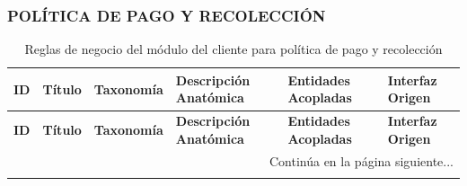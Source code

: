 \begin{landscape}
\subsubsection{POLÍTICA DE PAGO Y RECOLECCIÓN}
\begingroup
\setlength{\LTleft}{\fill}
\setlength{\LTright}{\fill}

\begin{longtable}[c]{l p{2.1cm} p{2.1cm} p{8cm} p{4cm} p{3cm}}
\caption{Reglas de negocio del módulo del cliente para política de pago y recolección} \label{tab:reglas-negocio-cliente-politica-pago-recoleccion}\\
\toprule
\textbf{ID} & \textbf{Título} & \textbf{Taxonomía} & \textbf{Descripción Anatómica} & \textbf{Entidades Acopladas} & \textbf{Interfaz Origen} \\
\midrule
\endfirsthead

\toprule
\textbf{ID} & \textbf{Título} & \textbf{Taxonomía} & \textbf{Descripción Anatómica} & \textbf{Entidades Acopladas} & \textbf{Interfaz Origen} \\
\midrule
\endhead

\midrule
\multicolumn{6}{r}{\small Continúa en la página siguiente...} \\
\endfoot
\bottomrule
\endlastfoot


\end{longtable}
\end{landscape}
